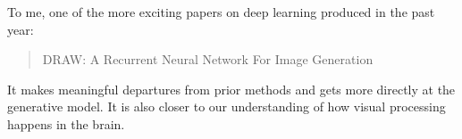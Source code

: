 \documentclass[xetex,mathserif,serif,aspectratio=169]{beamer}
\begin{document}
{
\begin{frame}[plain]
\end{frame}
}

{
\begin{frame}[plain]
\end{frame}
}

\begin{frame}[fragile] \frametitle{} \oldB \small

To me, one of the more exciting papers on deep learning
produced in the past year:
\begin{quote}
DRAW: A Recurrent Neural Network For Image Generation
\end{quote}
It makes meaningful departures from prior methods and gets
more directly at the generative model. It is also closer to
our understanding of how visual processing happens in the
brain.

\end{frame}
\end{document}
